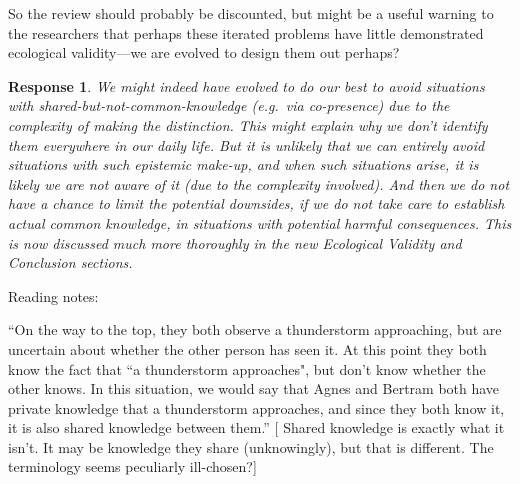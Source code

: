 \documentclass[a4paper]{article}
\newtheorem{response}{Response}
\newenvironment{robin}{\smallskip \noindent \color{red!10!green!50!blue}}{\color{black}\smallskip}
\begin{document}
So the review should probably be discounted, but might be a useful warning to the researchers that perhaps these iterated problems have little demonstrated ecological validity---we are evolved to design them out perhaps?

\begin{response}
We might indeed have evolved to do our best to avoid situations with shared-but-not-common-knowledge (e.g.\ via co-presence) due to the complexity of making the distinction. This might explain why we don't identify them everywhere in our daily life. But it is unlikely that we can entirely avoid situations with such epistemic make-up, and when such situations arise, it is likely we are not aware of it (due to the complexity involved). And then we do not have a chance to limit the potential downsides, if we do not take care to establish actual common knowledge, in situations with potential harmful consequences. This is now discussed much more thoroughly in the new Ecological Validity and Conclusion sections.
\end{response}


Reading notes:

``On the way to the top, they both observe a thunderstorm approaching, but are uncertain about whether the other person has seen it. At this point they both know the fact that ``a thunderstorm approaches", but don't know whether the other knows. In this situation, we would say that Agnes and Bertram both have private knowledge that a thunderstorm approaches, and since they both know it, it is also shared knowledge between them.''
[ Shared knowledge is exactly what it isn't. It may be knowledge they share (unknowingly), but that is different. The terminology seems peculiarly ill-chosen?]
\end{document}
